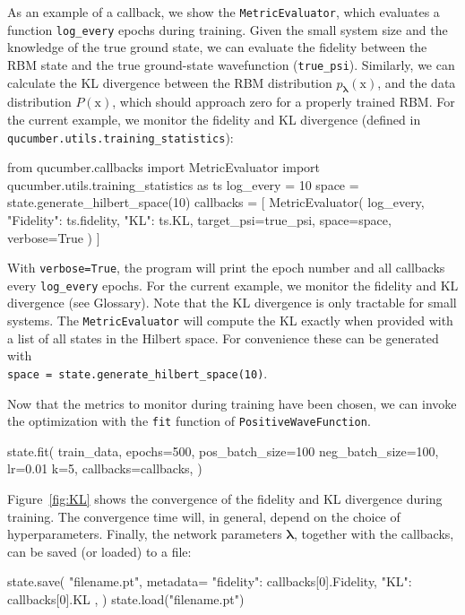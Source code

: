 \documentclass[submission, Phys, hidelnks]{SciPost}
\newcommand{\x}{\bm{\mathrm{x}}}
\begin{document}
As an example of a callback, we show the \verb|MetricEvaluator|, which
evaluates a function \verb|log_every| epochs during training.
Given the small system size and the knowledge of the true ground state, we can
evaluate the fidelity between the RBM state and the true ground-state
wavefunction (\verb|true_psi|).
Similarly, we can calculate the KL divergence between the RBM distribution
$p_{\bm{\lambda}}(\x)$, and the data distribution $P(\x)$, which should
approach zero for a properly trained RBM.\@
For the current example, we monitor the fidelity and KL divergence (defined in
\verb|qucumber.utils.training_statistics|):
\begin{python}
from qucumber.callbacks import MetricEvaluator
import qucumber.utils.training_statistics as ts
log_every = 10
space = state.generate_hilbert_space(10)
callbacks = [
    MetricEvaluator(
        log_every,
        {"Fidelity": ts.fidelity, "KL": ts.KL},
        target_psi=true_psi,
        space=space,
        verbose=True
    )
]
\end{python}
With \verb|verbose=True|, the program will print the epoch number and all
callbacks every \verb|log_every| epochs.
For the current example, we monitor the fidelity and KL divergence (see Glossary).
Note that the KL divergence is only tractable for small systems.
The \verb|MetricEvaluator| will compute the KL exactly when provided with a list of all states in the Hilbert space. For convenience these can be generated with \\
\verb|space = state.generate_hilbert_space(10)|.

Now that the metrics to monitor during
training have been chosen, we can invoke the optimization with the \verb|fit|
function of \verb|PositiveWaveFunction|.
\begin{python}
state.fit(
    train_data,
    epochs=500,
    pos_batch_size=100
    neg_batch_size=100,
    lr=0.01
    k=5,
    callbacks=callbacks,
)
\end{python}
Figure~\ref{fig:KL} shows the convergence of the fidelity and KL divergence
during training. The convergence time will, in general, depend on the choice
of hyperparameters.
Finally, the network parameters $\bm{\lambda}$, together with the callbacks, can be
saved (or loaded) to a file:
\begin{python}
state.save(
    "filename.pt",
    metadata={
        "fidelity": callbacks[0].Fidelity,
        "KL": callbacks[0].KL
    },
)
state.load("filename.pt")
\end{python}
\end{document}
